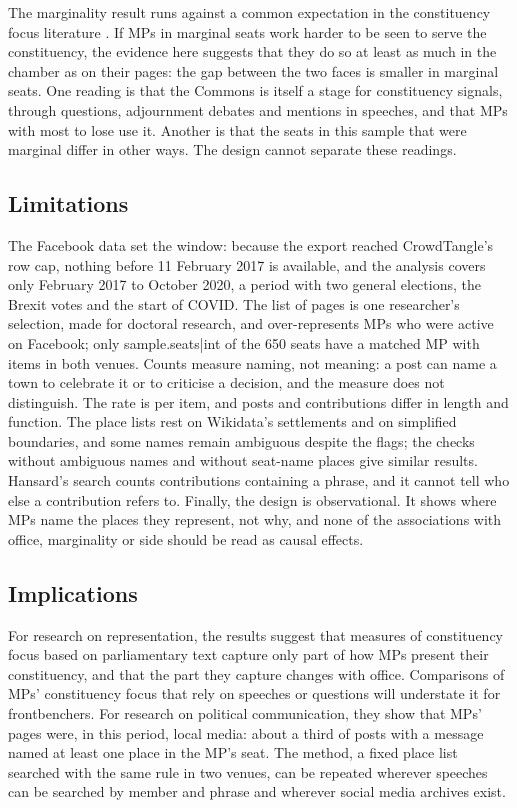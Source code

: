 \documentclass[11pt,a4paper]{article}
\begin{document}
The marginality result runs against a common expectation in the constituency focus literature \citep{kellermann2016,andre2015}. If MPs in marginal seats work harder to be seen to serve the constituency, the evidence here suggests that they do so at least as much in the chamber as on their pages: the gap between the two faces is smaller in marginal seats. One reading is that the Commons is itself a stage for constituency signals, through questions, adjournment debates and mentions in speeches, and that MPs with most to lose use it. Another is that the seats in this sample that were marginal differ in other ways. The design cannot separate these readings.

\subsection{Limitations}
The Facebook data set the window: because the export reached CrowdTangle's row cap, nothing before 11 February 2017 is available, and the analysis covers only February 2017 to October 2020, a period with two general elections, the Brexit votes and the start of COVID. The list of pages is one researcher's selection, made for doctoral research, and over-represents MPs who were active on Facebook; only {{sample.seats|int}} of the 650 seats have a matched MP with items in both venues. Counts measure naming, not meaning: a post can name a town to celebrate it or to criticise a decision, and the measure does not distinguish. The rate is per item, and posts and contributions differ in length and function. The place lists rest on Wikidata's settlements and on simplified boundaries, and some names remain ambiguous despite the flags; the checks without ambiguous names and without seat-name places give similar results. Hansard's search counts contributions containing a phrase, and it cannot tell who else a contribution refers to. Finally, the design is observational. It shows where MPs name the places they represent, not why, and none of the associations with office, marginality or side should be read as causal effects.

\subsection{Implications}
For research on representation, the results suggest that measures of constituency focus based on parliamentary text capture only part of how MPs present their constituency, and that the part they capture changes with office. Comparisons of MPs' constituency focus that rely on speeches or questions will understate it for frontbenchers. For research on political communication, they show that MPs' pages were, in this period, local media: about a third of posts with a message named at least one place in the MP's seat. The method, a fixed place list searched with the same rule in two venues, can be repeated wherever speeches can be searched by member and phrase and wherever social media archives exist.
\end{document}
